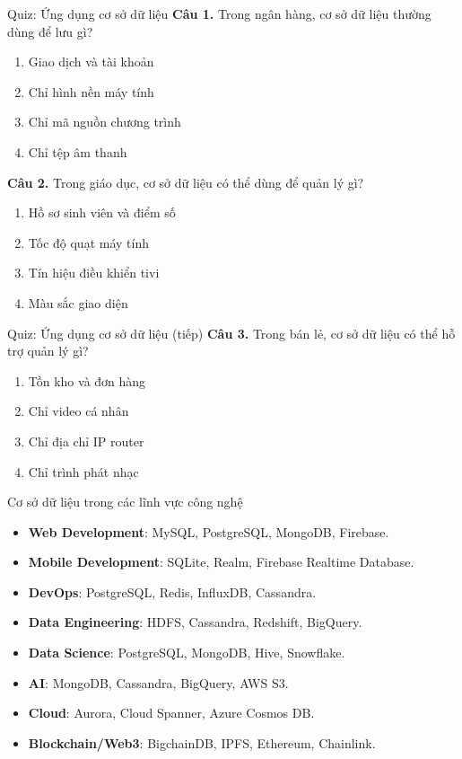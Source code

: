 ﻿\documentclass[aspectratio=169,11pt]{beamer}
\newcommand{\tightlist}{\setlength{\itemsep}{2pt}\setlength{\parskip}{0pt}}
\newcommand{\qoption}[2]{\item[#1.] #2}
\begin{document}
\begin{frame}{Quiz: Ứng dụng cơ sở dữ liệu}
\small
\textbf{Câu 1.} Trong ngân hàng, cơ sở dữ liệu thường dùng để lưu gì?
\begin{enumerate}
\tightlist
  \qoption{A}{Giao dịch và tài khoản}
  \qoption{B}{Chỉ hình nền máy tính}
  \qoption{C}{Chỉ mã nguồn chương trình}
  \qoption{D}{Chỉ tệp âm thanh}
\end{enumerate}

\textbf{Câu 2.} Trong giáo dục, cơ sở dữ liệu có thể dùng để quản lý gì?
\begin{enumerate}
\tightlist
  \qoption{A}{Hồ sơ sinh viên và điểm số}
  \qoption{B}{Tốc độ quạt máy tính}
  \qoption{C}{Tín hiệu điều khiển tivi}
  \qoption{D}{Màu sắc giao diện}
\end{enumerate}
\end{frame}

\begin{frame}{Quiz: Ứng dụng cơ sở dữ liệu (tiếp)}
\small
\textbf{Câu 3.} Trong bán lẻ, cơ sở dữ liệu có thể hỗ trợ quản lý gì?
\begin{enumerate}
\tightlist
  \qoption{A}{Tồn kho và đơn hàng}
  \qoption{B}{Chỉ video cá nhân}
  \qoption{C}{Chỉ địa chỉ IP router}
  \qoption{D}{Chỉ trình phát nhạc}
\end{enumerate}
\end{frame}

\begin{frame}{Cơ sở dữ liệu trong các lĩnh vực công nghệ}
\small
\begin{itemize}
\tightlist
  \item \textbf{Web Development}: MySQL, PostgreSQL, MongoDB, Firebase.
  \item \textbf{Mobile Development}: SQLite, Realm, Firebase Realtime Database.
  \item \textbf{DevOps}: PostgreSQL, Redis, InfluxDB, Cassandra.
  \item \textbf{Data Engineering}: HDFS, Cassandra, Redshift, BigQuery.
  \item \textbf{Data Science}: PostgreSQL, MongoDB, Hive, Snowflake.
  \item \textbf{AI}: MongoDB, Cassandra, BigQuery, AWS S3.
  \item \textbf{Cloud}: Aurora, Cloud Spanner, Azure Cosmos DB.
  \item \textbf{Blockchain/Web3}: BigchainDB, IPFS, Ethereum, Chainlink.
\end{itemize}
\end{frame}
\end{document}
